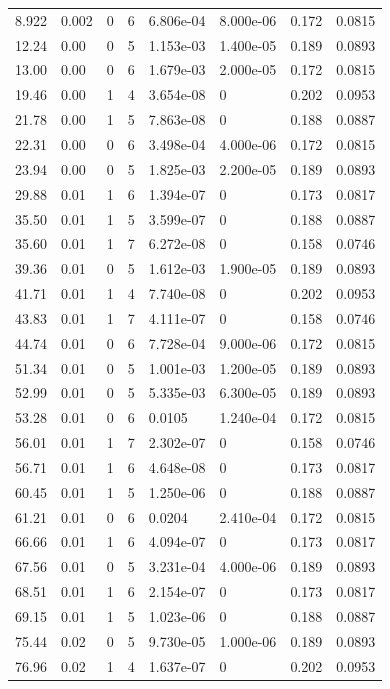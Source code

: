 \documentclass[preview]{standalone}
\begin{document}
{{\begin{tabular}{L{1.2cm}C{1.2cm} C{0.3cm}C{0.5cm} C{1.4cm}C{1.4cm} C{1.4cm}C{1.4cm}}
  8.922  &  0.002  & 0     &  6 &  6.806e-04  & 8.000e-06  & 0.172 &  0.0815   \\ 
  12.24  &  0.00  & 0     &  5 &  1.153e-03  & 1.400e-05  & 0.189 &  0.0893   \\ 
  13.00  &  0.00  & 0     &  6 &  1.679e-03  & 2.000e-05  & 0.172 &  0.0815   \\ 
  19.46  &  0.00  & 1     &  4 &  3.654e-08  & 0  & 0.202 &  0.0953   \\ 
  21.78  &  0.00  & 1     &  5 &  7.863e-08  & 0  & 0.188 &  0.0887   \\ 
  22.31  &  0.00  & 0     &  6 &  3.498e-04  & 4.000e-06  & 0.172 &  0.0815   \\ 
  23.94  &  0.00  & 0     &  5 &  1.825e-03  & 2.200e-05  & 0.189 &  0.0893   \\ 
  29.88  &  0.01  & 1     &  6 &  1.394e-07  & 0  & 0.173 &  0.0817   \\ 
  35.50  &  0.01  & 1     &  5 &  3.599e-07  & 0  & 0.188 &  0.0887   \\ 
  35.60  &  0.01  & 1     &  7 &  6.272e-08  & 0  & 0.158 &  0.0746   \\ 
  39.36  &  0.01  & 0     &  5 &  1.612e-03  & 1.900e-05  & 0.189 &  0.0893   \\ 
  41.71  &  0.01  & 1     &  4 &  7.740e-08  & 0  & 0.202 &  0.0953   \\ 
  43.83  &  0.01  & 1     &  7 &  4.111e-07  & 0  & 0.158 &  0.0746   \\ 
  44.74  &  0.01  & 0     &  6 &  7.728e-04  & 9.000e-06  & 0.172 &  0.0815   \\ 
  51.34  &  0.01  & 0     &  5 &  1.001e-03  & 1.200e-05  & 0.189 &  0.0893   \\ 
  52.99  &  0.01  & 0     &  5 &  5.335e-03  & 6.300e-05  & 0.189 &  0.0893   \\ 
  53.28  &  0.01  & 0     &  6 &  0.0105  & 1.240e-04  & 0.172 &  0.0815   \\ 
  56.01  &  0.01  & 1     &  7 &  2.302e-07  & 0  & 0.158 &  0.0746   \\ 
  56.71  &  0.01  & 1     &  6 &  4.648e-08  & 0  & 0.173 &  0.0817   \\ 
  60.45  &  0.01  & 1     &  5 &  1.250e-06  & 0  & 0.188 &  0.0887   \\ 
  61.21  &  0.01  & 0     &  6 &  0.0204  & 2.410e-04  & 0.172 &  0.0815   \\ 
  66.66  &  0.01  & 1     &  6 &  4.094e-07  & 0  & 0.173 &  0.0817   \\ 
  67.56  &  0.01  & 0     &  5 &  3.231e-04  & 4.000e-06  & 0.189 &  0.0893   \\ 
  68.51  &  0.01  & 1     &  6 &  2.154e-07  & 0  & 0.173 &  0.0817   \\ 
  69.15  &  0.01  & 1     &  5 &  1.023e-06  & 0  & 0.188 &  0.0887   \\ 
  75.44  &  0.02  & 0     &  5 &  9.730e-05  & 1.000e-06  & 0.189 &  0.0893   \\ 
  76.96  &  0.02  & 1     &  4 &  1.637e-07  & 0  & 0.202 &  0.0953   \\ 
\hline 
\end{tabular} 

}}
\end{document}
